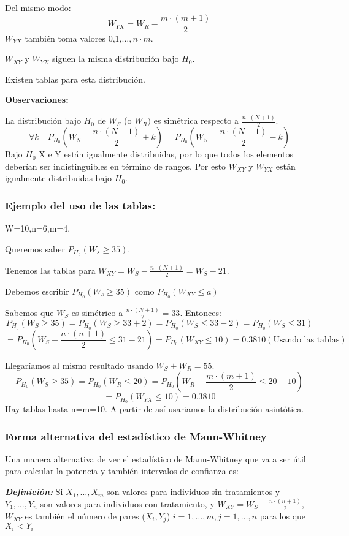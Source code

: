 Del mismo modo:
\[
W_{YX}=W_R- \frac{m \cdot (m+1)}{2}
\]
$W_{YX}$ también toma valores 0,1,$\dots,n \cdot m$.

$W_{XY}$ y $W_{YX}$ siguen la misma distribución bajo $H_0$.

Existen tablas para esta distribución.

\textbf{Observaciones:}

La distribución bajo $H_0$ de $W_S$ (o $W_R)$ es simétrica respecto a $\frac{n \cdot (N+1)}{2}$.
\[
\forall k \quad P_{H_0} \left( W_S=\frac{n \cdot (N+1)}{2}+k\right)=
P_{H_0} \left( W_S=\frac{n \cdot (N+1)}{2}-k\right)
\]
Bajo $H_0$ X e Y están igualmente distribuidas, por lo que todos los elementos deberían ser indistinguibles en término de rangos.
Por esto $W_{XY}$ y $W_{YX}$ están igualmente distribuidas bajo $H_0$.

\subsubsection*{Ejemplo del uso de las tablas:}
W=10,n=6,m=4.

Queremos saber $P_{H_0}(W_s \geq 35)$.

Tenemos las tablas para $W_{XY}=W_S-\frac{n \cdot (N+1)}{2}=W_S-21$.

Debemos escribir $P_{H_0}(W_s \geq 35)$ como $P_{H_0}(W_{XY} \leq a)$

Sabemos que $W_S$ es simétrico a $\frac{n \cdot (N+1)}{2}=33$. Entonces:
\[
P_{H_0}(W_S \geq 35)= P_{H_0}(W_S \geq 33+2)=P_{H_0}(W_S \leq 33-2)=P_{H_0}(W_S \leq 31)
\]
\[
=P_{H_0}\left(W_S-\frac{n \cdot (n+1)}{2} \leq 31-21\right)= P_{H_0} (W_{XY} \leq 10)=0.3810 (\text{Usando las tablas})
\]

Llegaríamos al mismo resultado usando $W_S+W_R=55$.
\[
    P_{H_0}(W_S \geq 35)= P_{H_0}(W_R \leq 20)= P_{H_0} \left( W_R - \frac{m \cdot (m+1)}{2} \leq 20-10\right)
\]
\[
    = P_{H_0} (W_{YX} \leq 10)=0.3810
\]
Hay tablas hasta n=m=10. A partir de así usariamos la distribución asintótica.

\subsubsection{Forma alternativa del estadístico de Mann-Whitney}
Una manera alternativa de ver el estadístico de Mann-Whitney que va a ser útil para calcular la potencia y también intervalos de confianza es:

\textit{\textbf{Definición: }} Si $X_1,\dots,X_m$ son valores para individuos sin tratamientos y $Y_1,\dots,Y_n$ son valores para individuos con tratamiento,
y $W_{XY}=W_S-\frac{n \cdot (n+1)}{2}$, $W_{XY}$ es también el número de pares ($X_i,Y_j$) $i=1,\dots,m, j=1,\dots,n$ para los que $X_i < Y_i$


